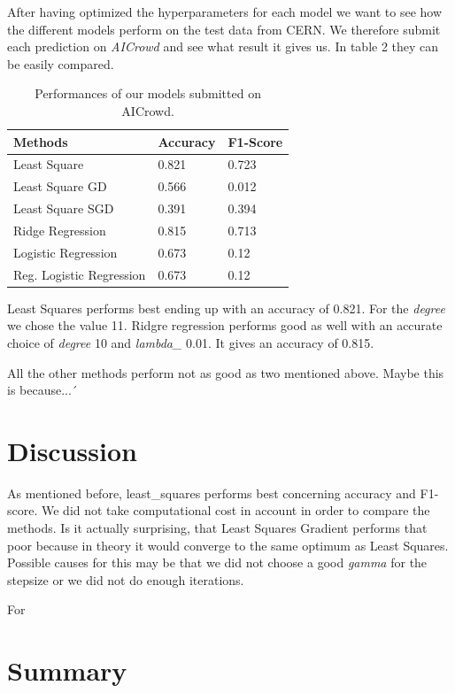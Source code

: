 \documentclass[10pt,conference,compsocconf]{IEEEtran}
\begin{document}
After having optimized the hyperparameters for each model we want to see how the different models perform on the test data from CERN. We therefore submit each prediction on \textit{AICrowd} and see what result it gives us. In table 2 they can be easily compared.


\begin{table}[htbp]
	\centering
	\begin{tabular}[c]{|l||l|l|}
		\hline
		Methods&Accuracy&F1-Score\\
		\hline
		Least Square&0.821&0.723\\
		Least Square GD&0.566&0.012\\
		Least Square SGD&0.391&0.394\\		
		Ridge Regression&0.815&0.713\\
		Logistic Regression&0.673&0.12\\
		Reg. Logistic Regression&0.673&0.12\\
		\hline
	\end{tabular}
	\caption{Performances of our models submitted on AICrowd.}
	\label{tab:perform}
\end{table}

Least Squares performs best ending up with an accuracy of 0.821. For the \textit{degree} we chose the value 11. Ridgre regression performs good as well with an accurate choice of \textit{degree} 10 and \textit{lambda\_} 0.01. It gives an accuracy of 0.815.



All the other methods perform not as good as two mentioned above. Maybe this is because...´

\section{Discussion}

As mentioned before, least\_squares performs best concerning accuracy and F1-score. We did not take computational cost in account in order to compare the methods.
Is it actually surprising, that Least Squares Gradient performs that poor because in theory it would converge to the same optimum as Least Squares. Possible causes for this may be that we did not choose a good \textit{gamma} for the stepsize or we did not do enough iterations. 

For 


\section{Summary}






\end{document}
